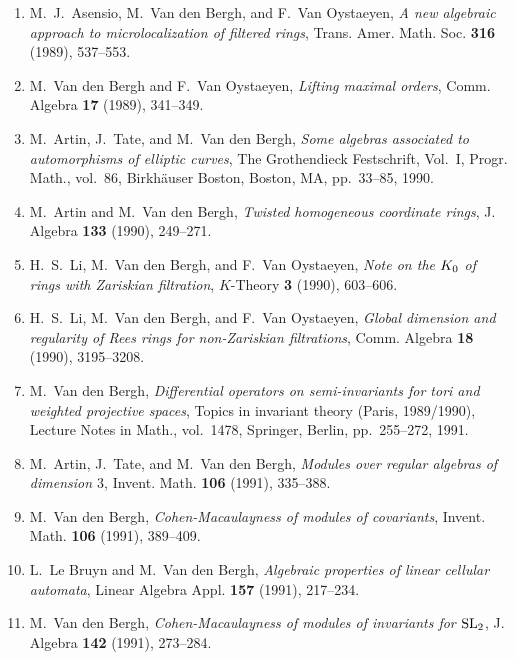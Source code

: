 \begin{enumerate}
\item
M.~J.~Asensio, M.~Van den Bergh, and F.~Van Oystaeyen, {\em A new algebraic approach to microlocalization of filtered rings}, Trans. Amer. Math. Soc. {\bf 316} (1989), 537--553.

\item
M.~Van den Bergh and F.~Van Oystaeyen, {\em Lifting maximal orders}, Comm. Algebra {\bf 17} (1989), 341--349.

\item
M.~Artin, J.~Tate, and M.~Van den Bergh, {\em Some algebras associated to automorphisms of elliptic curves}, The Grothendieck Festschrift, Vol.\ I, Progr. Math., vol.~86, Birkh\"auser Boston, Boston, MA, pp.~33--85, 1990.

\item
M.~Artin and M.~Van den Bergh, {\em Twisted homogeneous coordinate rings}, J. Algebra {\bf 133} (1990), 249--271.

\item
H.~S.~Li, M.~Van den Bergh, and F.~Van Oystaeyen, {\em Note on the $K\sb 0$ of rings with Zariskian filtration}, $K$-Theory {\bf 3} (1990), 603--606.

\item
H.~S.~Li, M.~Van den Bergh, and F.~Van Oystaeyen, {\em Global dimension and regularity of Rees rings for non-Zariskian filtrations}, Comm. Algebra {\bf 18} (1990), 3195--3208.

\item
M.~Van den Bergh, {\em Differential operators on semi-invariants for tori and weighted projective spaces}, Topics in invariant theory (Paris, 1989/1990), Lecture Notes in Math., vol.~1478, Springer, Berlin, pp.~255--272, 1991.

\item
M.~Artin, J.~Tate, and M.~Van den Bergh, {\em Modules over regular algebras of dimension $3$}, Invent. Math. {\bf 106} (1991), 335--388.

\item
M.~Van den Bergh, {\em Cohen-Macaulayness of modules of covariants}, Invent. Math. {\bf 106} (1991), 389--409.

\item
L.~Le Bruyn and M.~Van den Bergh, {\em Algebraic properties of linear cellular automata}, Linear Algebra Appl. {\bf 157} (1991), 217--234.

\item
M.~Van den Bergh, {\em Cohen-Macaulayness of modules of invariants for $\rm {S}{L}\sb 2$}, J. Algebra {\bf 142} (1991), 273--284.


\end{enumerate}
